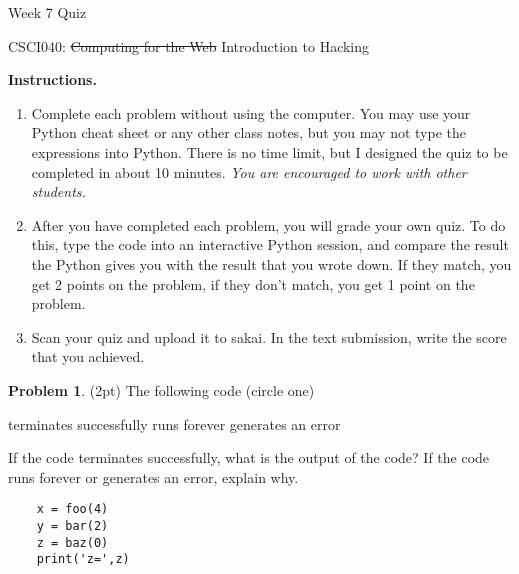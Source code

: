 \documentclass[10pt]{article}
\theoremstyle{definition}
\newtheorem{problem}{Problem}
\begin{document}
\begin{center}
    {
\Large
Week 7 Quiz
}

    \vspace{0.1in}
    CSCI040: \sout{Computing for the Web} Introduction to Hacking

    \vspace{0.1in}
\end{center}

\vspace{0.15in}
%
%

\noindent\textbf{Instructions.}
\begin{enumerate}
\item
Complete each problem without using the computer.  
You may use your Python cheat sheet or any other class notes,
but you may not type the expressions into Python.
There is no time limit, but I designed the quiz to be completed in about 10 minutes.
\emph{You are encouraged to work with other students.}
\item
After you have completed each problem, you will grade your own quiz.
To do this, type the code into an interactive Python session,
and compare the result the Python gives you with the result that you wrote down.
If they match, you get 2 points on the problem,
if they don't match, you get 1 point on the problem.
\item
Scan your quiz and upload it to sakai.
In the text submission, write the score that you achieved.
\end{enumerate}
\vspace{0.15in}

\begin{problem}
    (2pt)
    The following code (circle one)
    
    \vspace{0.25in}
    \hspace{0.5in}terminates successfully
    \hspace{1in}runs forever
    \hspace{1in}generates an error
    \vspace{0.25in}

    \noindent
    If the code terminates successfully, what is the output of the code?
    If the code runs forever or generates an error, explain why.
\end{problem}
\begin{lstlisting}
    x = foo(4)
    y = bar(2)
    z = baz(0)
    print('z=',z)
\end{lstlisting}
\vspace{1.5in}
\end{document}
